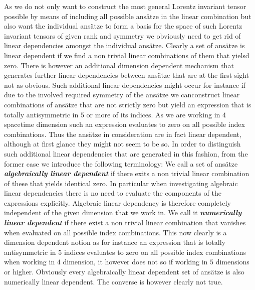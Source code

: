 \documentclass[a4paper,12pt, DIV=14, BCOR=5mm, twoside, headsepline]{scrbook}
\begin{document}
As we do not only want to construct the most general Lorentz invariant tensor possible by means of including all possible ansätze in the linear combination but also want the individual ansätze to form a basis for the space of such Lorentz invariant tensors of given rank and symmetry we obviously need to get rid of linear dependencies amongst the individual ansätze. Clearly a set of ansätze is linear dependent if we find a non trivial linear combinations of them that yielsd zero. 
There is however an additional dimension dependent mechanism that generates further linear dependencies between ansätze that are at the first sight not as obvious. Such additional linear dependencies might occur for instance if due to the involved required symmetry of the ansätze we canconstruct linear combinations of ansätze that are not strictly zero but yield an expression that is totally antisymmetric in $5$ or more of its indices. As we are working in $4$ spacetime dimension such an expression evaluates to zero on all possible index combinations. Thus the ansätze in consideration are in fact linear dependent, although at first glance they might not seem to be so. In order to distinguish such additional linear dependencies that are generated in this fashion, from the former case we introduce the following terminology: We call a set of ansätze \textit{\textbf{algebraically linear dependent}} if there exits a non trivial linear combination of these that yields identical zero. In particular when investigating algebraic linear dependencies there is no need to evaluate the components of the expressions explicitly. Algebraic linear dependency is therefore completely independent of the given dimension that we work in. We call it \textbf{\textit{numerically linear dependent}} if there exist a non trivial linear combination that vanishes when evaluated on all possible index combinations. This now clearly is a dimension dependent notion as for instance an expression that is totally antisymmetric in $5$ indices evaluates to zero on all possible index combinations when working in $4$ dimension, it however does not so if working in $5$ dimensions or higher. Obviously every algebraically linear dependent set of ansätze is also numerically linear dependent. The converse is however clearly not true.
\end{document}
